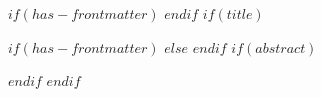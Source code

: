 $if(has-frontmatter)$
\frontmatter
$endif$
$if(title)$

\cleardoublepage
$if(has-frontmatter)$
$else$
\renewcommand*{\thepage}{\arabic{page}}
$endif$
$if(abstract)$
\begin{abstract}
$abstract$
\end{abstract}
$endif$
$endif$
